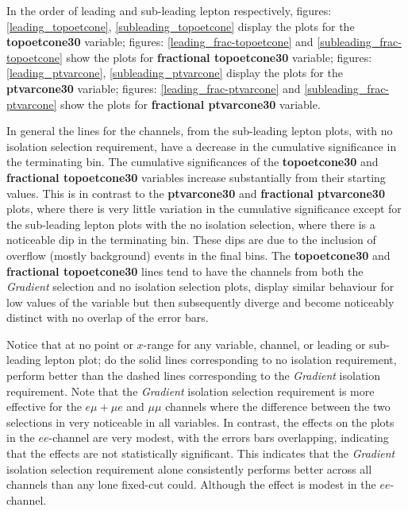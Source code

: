 In the order of leading and sub-leading lepton respectively, figures: \ref{leading_topoetcone}, \ref{subleading_topoetcone} display the plots for the \textbf{topoetcone30} variable; figures: \ref{leading_frac-topoetcone} and \ref{subleading_frac-topoetcone} show the plots for \textbf{fractional topoetcone30} variable; figures: \ref{leading_ptvarcone}, \ref{subleading_ptvarcone} display the plots for the \textbf{ptvarcone30} variable; figures: \ref{leading_frac-ptvarcone} and \ref{subleading_frac-ptvarcone} show the plots for \textbf{fractional ptvarcone30} variable.

In general the lines for the channels, from the sub-leading lepton plots, with no isolation selection requirement, have a decrease in the cumulative significance in the terminating bin. The cumulative significances of the \textbf{topoetcone30} and \textbf{fractional topoetcone30} variables increase substantially from their starting values. This is in contrast to the \textbf{ptvarcone30} and \textbf{fractional ptvarcone30} plots, where there is very little variation in the cumulative significance except for the sub-leading lepton plots with the no isolation selection, where there is a noticeable dip in the terminating bin. These dips are due to the inclusion of overflow (mostly background) events in the final bins. The \textbf{topoetcone30} and \textbf{fractional topoetcone30} lines tend to have the channels from both the \textit{Gradient} selection and no isolation selection plots, display similar behaviour for low values of the variable but then subsequently diverge and become noticeably distinct with no overlap of the error bars.

Notice that at no point or $x$-range for any variable, channel, or leading or sub-leading lepton plot; do the solid lines corresponding to no isolation requirement, perform better than the dashed lines corresponding to the \textit{Gradient} isolation requirement. Note that the \textit{Gradient} isolation selection requirement is more effective for the $e\mu + \mu e$ and $\mu\mu$ channels where the difference between the two selections in very noticeable in all variables. In contrast, the effects on the plots in the $ee$-channel are very modest, with the errors bars overlapping, indicating that the effects are not statistically significant. This indicates that the \textit{Gradient} isolation selection requirement alone consistently performs better across all channels than any lone fixed-cut could. Although the effect is modest in the $ee$-channel.

